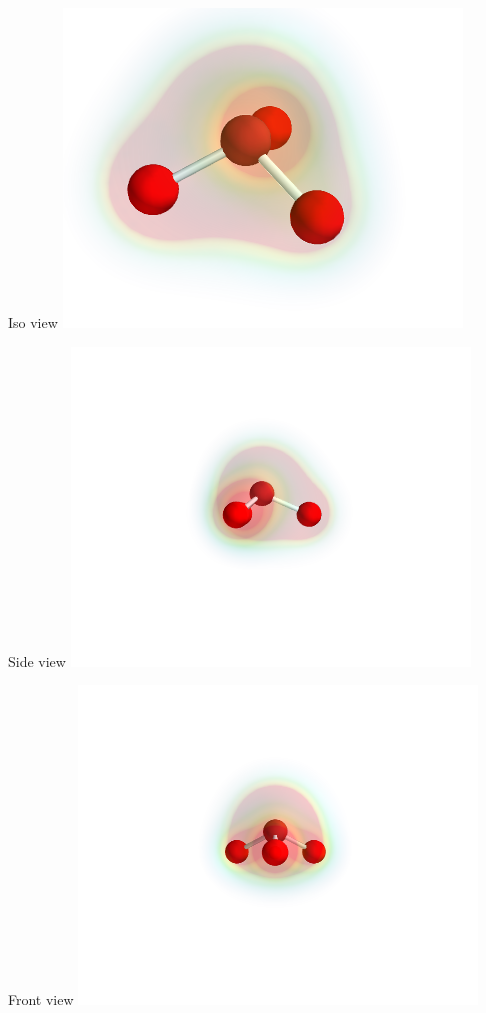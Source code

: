 \documentclass[11pt]{article}
\begin{document}
\begin{itemize}
Iso view
\includegraphics[width=.9\linewidth]{./images/NH3_iso.png}

Side view
\includegraphics[width=.9\linewidth]{./images/NH3_side.png}

Front view
\includegraphics[width=.9\linewidth]{./images/NH3_front.png}


\end{itemize}
\end{document}
